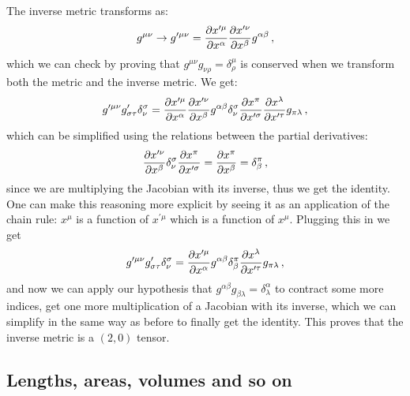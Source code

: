 \documentclass[main.tex]{subfiles}
\begin{document}
The inverse metric transforms as: 
%
\begin{equation}
  g^{\mu \nu } \rightarrow
  g^{\prime \mu \nu } =
  \pdv{x^{\prime \mu  }}{x^{\alpha  }} 
  \pdv{x^{\prime \nu   }}{x^{\beta }}
  g^{\alpha \beta } 
\,,
\end{equation}
%
which we can check by proving that \(g^{\mu \nu }g_{\nu \rho  } = \delta^{\mu }_{\rho }\) is conserved when we transform both the metric and the inverse metric. We get: 
%
\begin{equation}
    g^{\prime \mu \nu } g_{\sigma \tau  }' \delta_{\nu }^{\sigma } =
    \pdv{x^{\prime \mu  }}{x^{\alpha  }} 
    \pdv{x^{\prime \nu   }}{x^{\beta }}
    g^{\alpha \beta } 
    \delta_{\nu }^{\sigma }
    \pdv{x^{ \pi  }}{x^{\prime \sigma  }} 
    \pdv{x^{ \lambda   }}{x^{\prime \tau  }} 
    g_{\pi  \lambda  }
\,,
\end{equation}
%
which can be simplified using the relations between the partial derivatives: 
%
\begin{equation}
    \pdv{x^{\prime \nu   }}{x^{\beta }}
    \delta_{\nu }^{\sigma }
    \pdv{x^{ \pi  }}{x^{\prime \sigma  }} 
    = \pdv{x^{\pi }}{x^{\beta }}
    = \delta^{\pi }_{\beta }
\,,
\end{equation}
%
since we are multiplying the Jacobian with its inverse, thus we get the identity. One can make this reasoning more explicit by seeing it as an application of the chain rule: \(x^{\mu }\) is a function of \(x^{\prime \mu }\) which is a function of \(x^{\mu } \).
Plugging this in we get 
%
\begin{equation}
    g^{\prime \mu \nu } g_{\sigma \tau  }' \delta_{\nu }^{\sigma } =
    \pdv{x^{\prime \mu  }}{x^{\alpha  }} 
    g^{\alpha \beta } 
    \delta^{\pi }_{\beta }
    \pdv{x^{ \lambda   }}{x^{\prime \tau  }} 
    g_{\pi  \lambda  }
\,,
\end{equation}
%
and now we can apply our hypothesis that \(g^{\alpha \beta }g_{\beta \lambda } = \delta^{\alpha }_{\lambda }\) to contract some more indices, get one more multiplication of a Jacobian with its inverse, which we can simplify in the same way as before to finally get the identity.
This proves that the inverse metric is a \((2,0)\) tensor.

\subsection{Lengths, areas, volumes and so on}
\end{document}
